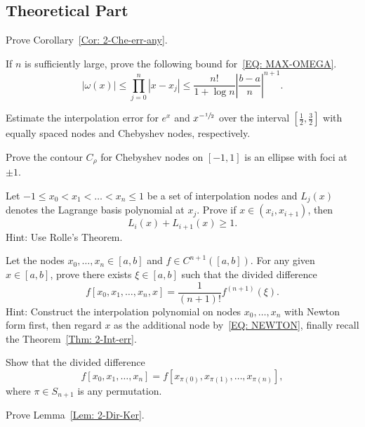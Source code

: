 \subsection{Theoretical Part}
\begin{problem}
    Prove Corollary~\ref{Cor: 2-Che-err-any}.
\end{problem}
\begin{problem}
    If $n$ is sufficiently large, prove the following bound for~\eqref{EQ: MAX-OMEGA}.
    \begin{equation}
        |\omega(x)|\le \prod_{j=0}^n |x - x_j| \le \frac{n!}{1 + \log n} \left|\frac{b-a}{n}\right|^{n+1}.
    \end{equation}
\end{problem}
\begin{problem}
\label{Prb: 2-Theo-2}
    Estimate the interpolation error for $e^x$ and $x^{-\sfrac{1}{2}}$ over the interval $[\frac{1}{2}, \frac{3}{2}]$ with equally spaced nodes and Chebyshev nodes, respectively.
\end{problem}
\begin{problem}
    Prove the contour $C_{\rho}$ for Chebyshev nodes on $[-1, 1]$ is an ellipse with foci at $\pm 1$. 
\end{problem}
\begin{problem}
    Let $-1\le x_0 < x_1 <\dots < x_n \le 1$ be a set of interpolation nodes and $L_j(x)$ denotes the Lagrange basis polynomial at $x_j$. Prove if $x\in (x_i, x_{i+1})$, then 
    $$L_{i}(x) + L_{i+1}(x) \ge 1.$$
    Hint: Use Rolle's Theorem.
\end{problem}
\begin{problem}
\label{Prb: 2-Theo-4}
    Let the nodes $x_0, \dots, x_n\in[a,b]$ and $f\in C^{n+1}([a, b])$. For any given $x\in[a, b]$, prove there exists $\xi\in [a, b]$ such that the divided difference $$f[x_0, x_1, \dots, x_n, x] = \frac{1}{(n+1)!}f^{(n+1)}(\xi).$$
    Hint: {Construct the interpolation polynomial on nodes $x_0, \dots, x_n$ with Newton form first, then regard $x$ as the additional node by~\eqref{EQ: NEWTON}, finally recall the Theorem~\ref{Thm: 2-Int-err}.}
\end{problem}
\begin{problem}
    Show that the divided difference $$f[x_0, x_1,\dots, x_n] = f[x_{\pi(0)}, x_{\pi(1)},\dots, x_{\pi(n)}],$$ where $\pi\in S_{n+1}$ is any permutation.
\end{problem}
\begin{problem}
\label{Prb: 2-Theo-6}
    Prove Lemma~\ref{Lem: 2-Dir-Ker}.
\end{problem}
